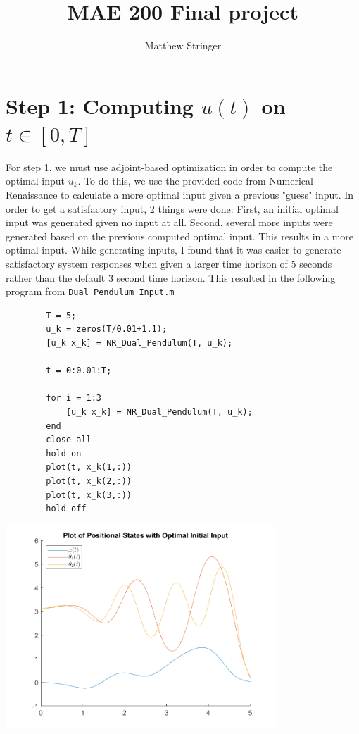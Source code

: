 \documentclass{article}
\title{MAE 200 Final project}
\author{Matthew Stringer}
\date{}
\theoremstyle{definition}
\begin{document}
    \maketitle
    \section*{Step 1: Computing $u(t)$ on $t \in [0,T]$}
    For step 1, we must use adjoint-based optimization in order to compute
    the optimal input $u_k$. To do this, we use the provided code from 
    Numerical Renaissance to calculate a more optimal input given a previous
    "guess" input. In order to get a satisfactory input, 2 things were done:
    First, an initial optimal input was generated given no input at all.
    Second, several more inputs were generated based on the previous computed
    optimal input.
    This results in a more optimal input.
    While generating inputs, I found that it was easier to generate satisfactory
    system responses when given a larger time horizon of 5 seconds rather than
    the default 3 second time horizon.
    This resulted in the following program from \texttt{Dual\_Pendulum\_Input.m}
    \begin{verbatim}
        T = 5;
        u_k = zeros(T/0.01+1,1);
        [u_k x_k] = NR_Dual_Pendulum(T, u_k);

        t = 0:0.01:T;

        for i = 1:3
            [u_k x_k] = NR_Dual_Pendulum(T, u_k);
        end
        close all
        hold on
        plot(t, x_k(1,:))
        plot(t, x_k(2,:))
        plot(t, x_k(3,:))
        hold off
    \end{verbatim}

    \begin{center}
        \includegraphics*[width=4in]{Matlab Code/Step1_final_plot.png}
    \end{center}
\end{document}
